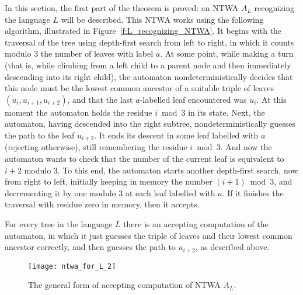 \documentclass[12pt,a4paper]{article}
\theoremstyle{definition}
\begin{document}
In this section, the first part of the theorem is proved:
an NTWA $A_L$ recognizing the language $L$ will be described.
This NTWA works using the following algorithm,
illustrated in Figure~\ref{f:L_recognizing_NTWA}.
It begins with the traversal of the tree using depth-first search from left to right,
in which it counts modulo $3$ the number of leaves with label $a$.
At some point, while making a turn
(that is, while climbing from a left child to a parent node
and then immediately descending into its right child),
the automaton nondeterministically decides
that this node must be the lowest common ancestor
of a suitable triple of leaves $(u_i, u_{i+1}, u_{i+2})$,
and that the last $a$-labelled leaf encountered was $u_i$.
At this moment the automaton holds the residue $i \bmod 3$ in its state.
Next, the automaton, having descended into the right subtree,
nondeterministically guesses the path to the leaf $u_{i+2}$.
It ends its descent in some leaf labelled with $a$ (rejecting otherwise),
still remembering the residue $i \bmod 3$.
And now the automaton wants to check that the number of the current leaf is equivalent to $i+2$ modulo $3$.
To this end, the automaton starts another depth-first search, now from right to left,
initially keeping in memory the number $(i+1) \bmod 3$,
and decrementing it by one modulo $3$ at each leaf labelled with $a$.
If it finishes the traversal with residue zero in memory, then it accepts.

For every tree in the language $L$
there is an accepting computation of the automaton,
in which it just guesses the triple of leaves and their lowest common ancestor correctly,
and then guesses the path to $u_{i+2}$, as described above.

\begin{figure}[t]
	\centerline{\texttt{[image: ntwa\_for\_L\_2]}}
	\caption{The general form of accepting computation of NTWA $A_L$.}
	\label{f:L_recognizing_NTWA_2}
\end{figure}
\end{document}
